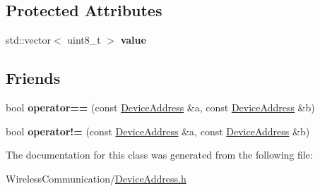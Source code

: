 \subsection*{Protected Attributes}
\begin{DoxyCompactItemize}
\item 
\hypertarget{class_device_address_a52af8f243ce02cd6aa3798ff8c91bbce}{}std\+::vector$<$ uint8\+\_\+t $>$ {\bfseries value}\label{class_device_address_a52af8f243ce02cd6aa3798ff8c91bbce}

\end{DoxyCompactItemize}
\subsection*{Friends}
\begin{DoxyCompactItemize}
\item 
\hypertarget{class_device_address_ad12612d4bc462ca3e4f3fc9b5891cc4d}{}bool {\bfseries operator==} (const \hyperlink{class_device_address}{Device\+Address} \&a, const \hyperlink{class_device_address}{Device\+Address} \&b)\label{class_device_address_ad12612d4bc462ca3e4f3fc9b5891cc4d}

\item 
\hypertarget{class_device_address_a6baeb447978c5a7bd562573559a68357}{}bool {\bfseries operator!=} (const \hyperlink{class_device_address}{Device\+Address} \&a, const \hyperlink{class_device_address}{Device\+Address} \&b)\label{class_device_address_a6baeb447978c5a7bd562573559a68357}

\end{DoxyCompactItemize}


The documentation for this class was generated from the following file\+:\begin{DoxyCompactItemize}
\item 
Wireless\+Communication/\hyperlink{_device_address_8h}{Device\+Address.\+h}\end{DoxyCompactItemize}
